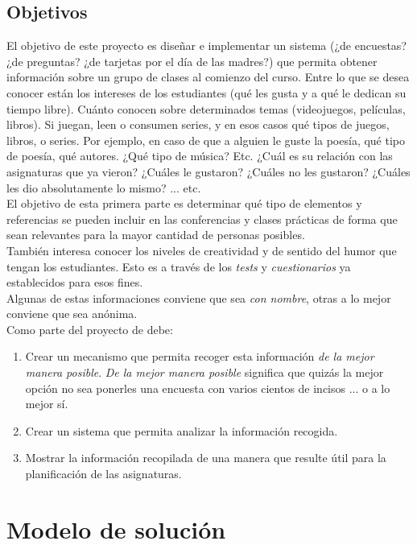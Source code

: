 \documentclass{book}
\begin{document}
		\subsection{Objetivos}
			El objetivo de este proyecto es dise\~nar e implementar un sistema (¿de encuestas? ¿de preguntas? ¿de tarjetas por el d\'ia de las madres?) que permita obtener informaci\'on sobre un grupo de clases al comienzo del curso. Entre lo que se desea conocer est\'an los intereses de los estudiantes (qu\'e les gusta y a qu\'e le dedican su tiempo libre). Cu\'anto conocen sobre determinados temas (videojuegos, pel\'iculas, libros). Si juegan, leen o consumen series, y en esos casos qu\'e tipos de juegos, libros, o series. Por ejemplo, en caso de que a alguien le guste la poes\'ia, qu\'e tipo de poes\'ia, qu\'e autores. ¿Qu\'e tipo de m\'usica? Etc. ¿Cu\'al es su relaci\'on con las asignaturas que ya vieron? ¿Cu\'ales le gustaron? ¿Cu\'ales no les gustaron? ¿Cu\'ales les dio absolutamente lo mismo? ... etc. \\
			El objetivo de esta primera parte es determinar qu\'e tipo de elementos y referencias se pueden incluir en las conferencias y clases pr\'acticas de forma que sean relevantes para la mayor cantidad de personas posibles. \\
			Tambi\'en interesa conocer los niveles de creatividad y de sentido del humor que tengan los estudiantes. Esto es a trav\'es de los \textit{tests} y \textit{cuestionarios} ya establecidos para esos fines. \\
			Algunas de estas informaciones conviene que sea \textit{con nombre}, otras a lo mejor conviene que sea an\'onima. \\
			Como parte del proyecto de debe:
			\begin{enumerate}
				\item Crear un mecanismo que permita recoger esta informaci\'on \textit{de la mejor manera posible}. \textit{De la mejor manera posible} significa que quiz\'as la mejor opci\'on no sea ponerles una encuesta con varios cientos de incisos ... o a lo mejor s\'i.
				\item Crear un sistema que permita analizar la informaci\'on recogida.
				\item Mostrar la informaci\'on recopilada de una manera que resulte \'util para la planificaci\'on de las asignaturas.
			\end{enumerate}
			
	\section{Modelo de soluci\'on}
\end{document}
